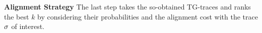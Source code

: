 \textbf{Alignment Strategy}\label{subsec:as}
%
%
%
The last step takes the so-obtained TG-traces and ranks the best $k$ by considering their probabilities and the alignment cost with the trace $\sigma$ of interest. %
